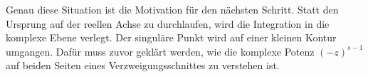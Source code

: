 
%		
%		
%		
%		
%		
%		
%		
Genau diese Situation ist die Motivation für den nächsten Schritt. 
Statt den Ursprung auf der reellen Achse zu durchlaufen, wird die Integration in die komplexe Ebene verlegt.
Der singuläre Punkt wird auf einer kleinen Kontur umgangen. 
Dafür muss zuvor geklärt werden, wie die komplexe Potenz $(-z)^{s-1}$ auf beiden Seiten eines Verzweigungsschnittes zu verstehen ist.
